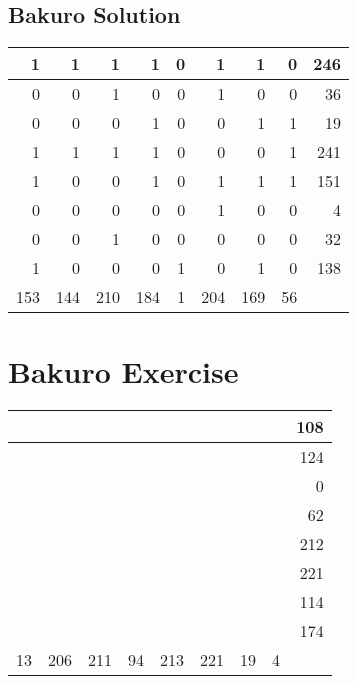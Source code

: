 \documentclass[]{article}
\begin{document}
 \subsection{Bakuro Solution} 
\begin{tabular}{rrrrrrrrr}
\hline
   1 &   1 &   1 &   1 & 0 &   1 &   1 &  0 & 246 \\ \hline
   0 &   0 &   1 &   0 & 0 &   1 &   0 &  0 &  36 \\ \hline
   0 &   0 &   0 &   1 & 0 &   0 &   1 &  1 &  19 \\ \hline
   1 &   1 &   1 &   1 & 0 &   0 &   0 &  1 & 241 \\ \hline
   1 &   0 &   0 &   1 & 0 &   1 &   1 &  1 & 151 \\ \hline
   0 &   0 &   0 &   0 & 0 &   1 &   0 &  0 &   4 \\ \hline
   0 &   0 &   1 &   0 & 0 &   0 &   0 &  0 &  32 \\ \hline
   1 &   0 &   0 &   0 & 1 &   0 &   1 &  0 & 138 \\ \hline
 153 & 144 & 210 & 184 & 1 & 204 & 169 & 56 &     \\ \hline
\hline
\end{tabular}\newpage\section{Bakuro Exercise}\begin{tabular}{rrrrrrrrr}
\hline
    &     &     &    &     &     &    &   & 108 \\ \hline
    &     &     &    &     &     &    &   & 124 \\ \hline
    &     &     &    &     &     &    &   &   0 \\ \hline
    &     &     &    &     &     &    &   &  62 \\ \hline
    &     &     &    &     &     &    &   & 212 \\ \hline
    &     &     &    &     &     &    &   & 221 \\ \hline
    &     &     &    &     &     &    &   & 114 \\ \hline
    &     &     &    &     &     &    &   & 174 \\ \hline
 13 & 206 & 211 & 94 & 213 & 221 & 19 & 4 &     \\ \hline
\hline
\end{tabular}\newpage 
\end{document}
